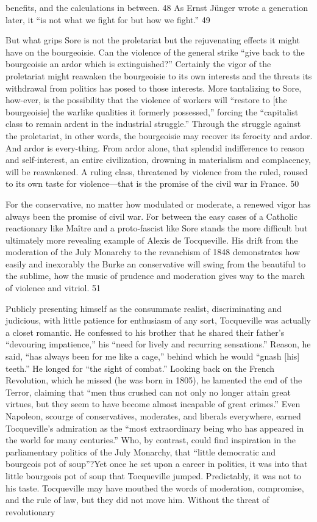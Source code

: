 benefits, and the calculations in between. {\color{blue} 48 } As Ernst Jünger wrote a generation later, it “is not what we fight for but how we fight.” {\color{blue} 49 } {\par} But what grips Sore is not the proletariat but the rejuvenating effects it might have on the bourgeoisie. Can the violence of the general strike “give back to the bourgeoisie an ardor which is extinguished?” Certainly the vigor of the proletariat might reawaken the bourgeoisie to its own interests and the threats its withdrawal from politics has posed to those interests. More tantalizing to Sore, how-ever, is the possibility that the violence of workers will “restore to [the bourgeoisie] the warlike qualities it formerly possessed,” forcing the “capitalist class to remain ardent in the industrial struggle.” Through the struggle against the proletariat, in other words, the bourgeoisie may recover its ferocity and ardor. And ardor is every-thing. From ardor alone, that splendid indifference to reason and self-interest, an entire civilization, drowning in materialism and complacency, will be reawakened. A ruling class, threatened by violence from the ruled, roused to its own taste for violence—that is the promise of the civil war in France. {\color{blue} 50 } {\par} For the conservative, no matter how modulated or moderate, a renewed vigor has always been the promise of civil war. For between the easy cases of a Catholic reactionary like Maître and a proto-fascist like Sore stands the more difficult but ultimately more revealing example of Alexis de Tocqueville. His drift from the moderation of the July Monarchy to the revanchism of 1848 demonstrates how easily and inexorably the Burke an conservative will swing from the beautiful to the sublime, how the music of prudence and moderation gives way to the march of violence and vitriol. {\color{blue} 51 } {\par} Publicly presenting himself as the consummate realist, discriminating and judicious, with little patience for enthusiasm of any sort, Tocqueville was actually a closet romantic. He confessed to his brother that he shared their father’s “devouring impatience,” his “need for lively and recurring sensations.” Reason, he said, “has always been for me like a cage,” behind which he would “gnash [his] teeth.” He longed for “the sight of combat.” Looking back on the French Revolution, which he missed (he was born in 1805), he lamented the end of the Terror, claiming that “men thus crushed can not only no longer attain great virtues, but they seem to have become almost incapable of great crimes.” Even Napoleon, scourge of conservatives, moderates, and liberals everywhere, earned Tocqueville’s admiration as the “most extraordinary being who has appeared in the world for many centuries.” Who, by contrast, could find inspiration in the parliamentary politics of the July Monarchy, that “little democratic and bourgeois pot of soup”?Yet once he set upon a career in politics, it was into that little bourgeois pot of soup that Tocqueville jumped. Predictably, it was not to his taste. Tocqueville may have mouthed the words of moderation, compromise, and the rule of law, but they did not move him. Without the threat of revolutionary 